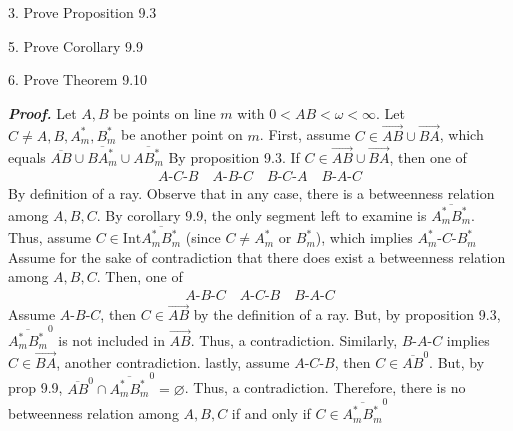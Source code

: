 \documentclass{report}
\begin{document}
    \bigbreak \noindent 
    \begin{mdframed}
        3.  Prove Proposition 9.3
    \end{mdframed}

    \bigbreak \noindent 
    \begin{mdframed}
        5. Prove Corollary 9.9
    \end{mdframed}

    \bigbreak \noindent 
    \begin{mdframed}
        6. Prove Theorem 9.10
    \end{mdframed}
    \bigbreak \noindent 
    \textbf{\textit{Proof.}} Let $A,B$ be points on line $m$ with $0 < AB < \omega < \infty$. Let $C \ne A,B,A^{*}_{m},B^{*}_{m} $ be another point on $m$.
    \bigbreak \noindent 
    First, assume $C \in \overrightarrow{AB} \cup \overrightarrow{BA}$, which equals $\overline{AB} \cup \overline{BA^{*}_{m}}  \cup \overline{AB_{m}^{*}}$ By proposition 9.3. If $C \in \overrightarrow{AB} \cup \overrightarrow{BA}$, then one of 
    \begin{align*}
        A\text{-}C\text{-}B \quad A\text{-}B\text{-}C \quad B\text{-}C\text{-}A \quad B\text{-}A\text{-}C
    \end{align*}
    By definition of a ray. Observe that in any case, there is a betweenness relation among $A,B,C$. 
    \bigbreak \noindent 
    By corollary 9.9, the only segment left to examine is $ \overline{A_{m}^{*}B_{m}^{*}}$. Thus, assume $C \in \text{Int}\overline{A_{m}^{*}B_{m}^{*}} $ (since $C \ne A^{*}_{m}$ or $B_{m}^{*}$), which implies $ A^{*}_{m}\text{-}C\text{-} B_{m}^{*}$
    \bigbreak \noindent 
    Assume for the sake of contradiction that there does exist a betweenness relation among $A,B,C$. Then, one of 
    \begin{align*}
        A\text{-}B\text{-}C \quad A\text{-}C\text{-}B \quad B\text{-}A\text{-}C
    \end{align*}
    \bigbreak \noindent 
    Assume $ A\text{-}B\text{-}C $, then $C \in \overrightarrow{AB}$ by the definition of a ray. But, by proposition 9.3, $\overline{A_{m}^{*}B^{*}_{m}}^{0} $ is not included in $\overrightarrow{AB}$. Thus, a contradiction. Similarly, $ B\text{-}A\text{-}C $ implies $ C \in \overrightarrow{BA}$, another contradiction.
    \bigbreak \noindent 
    lastly, assume $ A\text{-}C\text{-}B $, then $C \in \overline{AB}^{0}$. But, by prop 9.9, $ \overline{AB}^{0}\cap \overline{A^{*}_{m}B^{*}_{m}}^{0} = \varnothing$. Thus, a contradiction.
    \bigbreak \noindent 
    Therefore, there is no betweenness relation among $A,B,C$ if and only if $C \in \overline{A^{*}_{m}B^{*}_{m}}^{0}$ \endpf

    
    
\end{document}
